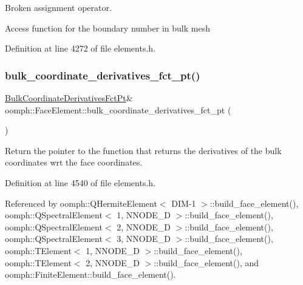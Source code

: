 Broken assignment operator. 

Access function for the boundary number in bulk mesh 

Definition at line 4272 of file elements.\+h.

\mbox{\label{classoomph_1_1FaceElement_abac8bdefea177d3a6f3a89ebbaf4ed4a}} 
\subsubsection{\texorpdfstring{bulk\+\_\+coordinate\+\_\+derivatives\+\_\+fct\+\_\+pt()}{bulk\_coordinate\_derivatives\_fct\_pt()}\hspace{0.1cm}{\footnotesize\ttfamily [1/2]}}
{\footnotesize\ttfamily \hyperlink{classoomph_1_1FaceElement_a67356b9329923767ab8f13fed85f7f88}{Bulk\+Coordinate\+Derivatives\+Fct\+Pt}\& oomph\+::\+Face\+Element\+::bulk\+\_\+coordinate\+\_\+derivatives\+\_\+fct\+\_\+pt (\begin{DoxyParamCaption}{ }\end{DoxyParamCaption})\hspace{0.3cm}{\ttfamily [inline]}}



Return the pointer to the function that returns the derivatives of the bulk coordinates wrt the face coordinates. 



Definition at line 4540 of file elements.\+h.



Referenced by oomph\+::\+Q\+Hermite\+Element$<$ D\+I\+M-\/1 $>$\+::build\+\_\+face\+\_\+element(), oomph\+::\+Q\+Spectral\+Element$<$ 1, N\+N\+O\+D\+E\+\_\+D $>$\+::build\+\_\+face\+\_\+element(), oomph\+::\+Q\+Spectral\+Element$<$ 2, N\+N\+O\+D\+E\+\_\+D $>$\+::build\+\_\+face\+\_\+element(), oomph\+::\+Q\+Spectral\+Element$<$ 3, N\+N\+O\+D\+E\+\_\+D $>$\+::build\+\_\+face\+\_\+element(), oomph\+::\+T\+Element$<$ 1, N\+N\+O\+D\+E\+\_\+D $>$\+::build\+\_\+face\+\_\+element(), oomph\+::\+T\+Element$<$ 2, N\+N\+O\+D\+E\+\_\+D $>$\+::build\+\_\+face\+\_\+element(), and oomph\+::\+Finite\+Element\+::build\+\_\+face\+\_\+element().

